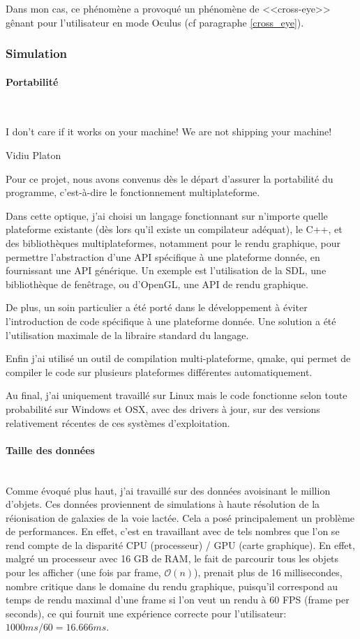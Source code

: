 \documentclass[a4paper,french,12pt]{article}
\begin{document}
	      Dans mon cas, ce phénomène a provoqué un phénomène de <<cross-eye>> gênant pour l'utilisateur en mode
	      Oculus (cf paragraphe \ref{cross_eye}).

	    \subsubsection{Simulation}
		\paragraph{Portabilité} ~\\
		  \epigraph{I don’t care if it works on your machine!  We are not shipping your machine!}{Vidiu Platon}

		  Pour ce projet, nous avons convenus dès le départ d'assurer la portabilité du programme, c'est-à-dire
		  le fonctionnement multiplateforme.

		  Dans cette optique, j'ai choisi un langage fonctionnant sur n'importe quelle plateforme existante
		  (dès lors qu'il existe un compilateur adéquat), le C++, et
		  des bibliothèques multiplateformes, notamment pour le rendu graphique,
		  pour permettre l'abstraction d'une API spécifique à une plateforme donnée, en fournissant une API générique.
		  Un exemple est l'utilisation de la SDL, une bibliothèque de fenêtrage, ou d'OpenGL, une API de rendu
		  graphique.

		  De plus, un soin particulier a été porté dans le développement à éviter l'introduction
		  de code spécifique à une plateforme donnée. Une solution a été l'utilisation maximale de la libraire
		  standard du langage.

		  Enfin j'ai utilisé un outil de compilation multi-plateforme, qmake, qui permet de compiler le code
		  sur plusieurs plateformes différentes automatiquement.

		  Au final, j'ai uniquement travaillé sur Linux mais le code fonctionne selon toute probabilité sur
		  Windows et OSX, avec des drivers à jour, sur des versions relativement récentes de ces systèmes d'exploitation.

		\paragraph{Taille des données} ~\\

		  Comme évoqué plus haut, j'ai travaillé sur des données avoisinant le million d'objets.
		  Ces données proviennent de simulations à haute résolution de la réionisation de galaxies de la voie lactée.
		  Cela a posé
		  principalement un problème de performances. En effet, c'est en travaillant avec de tels nombres que
		  l'on se rend compte de la disparité CPU (processeur) / GPU (carte graphique).
		  En effet, malgré un processeur avec 16 GB de RAM, le fait de parcourir tous les objets pour les afficher (une fois par frame, $\mathcal{O}(n)$),
		  prenait plus de 16 millisecondes, nombre critique dans le domaine du rendu graphique, puisqu'il
		  correspond au temps de rendu maximal d'une frame si l'on veut un rendu à 60 FPS (frame per seconds),
		  ce qui fournit une expérience correcte pour l'utilisateur: $1000 ms / 60 = 16.666 ms$.
\end{document}
